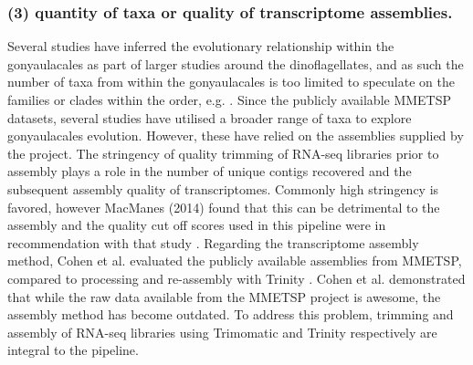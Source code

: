 \documentclass[12pt]{article}
\begin{document}
\subsubsection*{(3) quantity of taxa or quality of transcriptome assemblies.}
Several studies have inferred the evolutionary relationship within the gonyaulacales as part of larger studies around the dinoflagellates, and as such the number of taxa from within the gonyaulacales is too limited to speculate on the families or clades within the order, e.g. \cite{shalchian2006combined,zhang2007three,saldarriaga2004molecular,hoppenrath2010dinoflagellate,murray2005improving}.
Since the publicly available MMETSP datasets, several studies have utilised a broader range of taxa to explore gonyaulacales evolution. 
However, these have relied on the assemblies supplied by the project. 
The stringency of quality trimming of RNA-seq libraries prior to assembly plays a role in the number of unique contigs recovered and the subsequent assembly quality of transcriptomes. 
Commonly high stringency is favored, however MacManes (2014) found that this can be detrimental to the assembly and the quality cut off scores used in this pipeline were in recommendation with that study \cite{macmanes2014optimal}.
Regarding the transcriptome assembly method, Cohen et al. evaluated the publicly available assemblies from MMETSP, compared to processing and re-assembly with Trinity \cite{cohen-reass}. 
Cohen et al. demonstrated that while the raw data available from the MMETSP project is awesome, the assembly method has become outdated. 
To address this problem, trimming and assembly of RNA-seq libraries using Trimomatic and Trinity respectively are integral to the pipeline.
\end{document}
